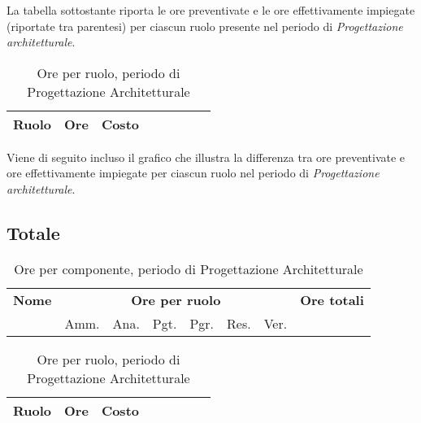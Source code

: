 La tabella sottostante riporta le ore preventivate e le ore effettivamente impiegate (riportate tra parentesi) per ciascun ruolo presente nel periodo di \textit{Progettazione architetturale}.

\begin{table}[H]
\begin{tabular}{lccccccc}
\toprule
    \textbf{Ruolo}  & \textbf{Ore} & \textbf{Costo} \\
    \midrule
    
    	
    
    \bottomrule
\end{tabular}
\caption{Ore per ruolo, periodo di Progettazione Architetturale}
\end{table}

Viene di seguito incluso il grafico che illustra la differenza tra ore preventivate e ore effettivamente impiegate per ciascun ruolo nel periodo di \textit{Progettazione architetturale}.


\subsection{Totale}

\begin{table}[H]
\begin{tabular}{lccccccc}
\toprule
    \textbf{Nome}  & \multicolumn{6}{c}{\textbf{Ore per ruolo}} & \textbf{Ore totali} \\
     & Amm. & Ana. & Pgt. & Pgr. & Res. & Ver. & \\
    \midrule
    
    	
    
    \bottomrule
\end{tabular}

\caption{Ore per componente, periodo di Progettazione Architetturale}
\end{table}

\begin{table}[H]
\begin{tabular}{lccccccc}
\toprule
    \textbf{Ruolo}  & \textbf{Ore} & \textbf{Costo} \\
    \midrule
    
    	
    
    \bottomrule
\end{tabular}
\caption{Ore per ruolo, periodo di Progettazione Architetturale}
\end{table}